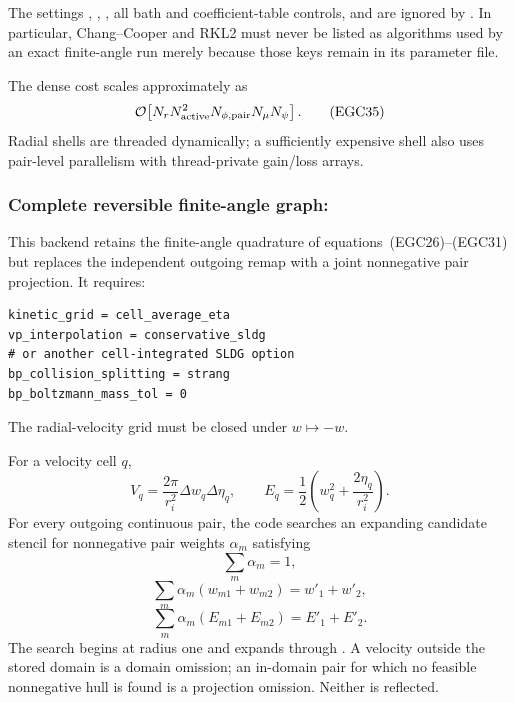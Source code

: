 The settings ,
, , all bath and
coefficient-table controls, and  are ignored by
.  In particular, Chang--Cooper and RKL2 must never be
listed as algorithms used by an exact finite-angle run merely because those
keys remain in its parameter file.

The dense cost scales approximately as
\[
 {\cal O}\!\left[
 N_rN_{\rm active}^2
 N_{\phi,\rm pair}N_\mu N_\psi
 \right].                                                \tag{EGC35}
\]
Radial shells are threaded dynamically; a sufficiently expensive shell also
uses pair-level parallelism with thread-private gain/loss arrays.

\subsubsection[Complete reversible finite-angle graph]{
Complete reversible finite-angle graph:
}

This backend retains the finite-angle quadrature of
equations~(EGC26)--(EGC31) but replaces the independent outgoing remap with a
joint nonnegative pair projection.  It requires:
\begin{lstlisting}
kinetic_grid = cell_average_eta
vp_interpolation = conservative_sldg
# or another cell-integrated SLDG option
bp_collision_splitting = strang
bp_boltzmann_mass_tol = 0
\end{lstlisting}
The radial-velocity grid must be closed under \(w\mapsto-w\).

For a velocity cell \(q\),
\[
 V_q=\frac{2\pi}{r_i^2}\Delta w_q\Delta\eta_q,\qquad
 E_q=\frac12\left(w_q^2+\frac{2\eta_q}{r_i^2}\right).     \tag{EGC36}
\]
For every outgoing continuous pair, the code searches an expanding candidate
stencil for nonnegative pair weights \(\alpha_m\) satisfying
\[
 \sum_m\alpha_m=1,                                       \tag{EGC37}
\]
\[
 \sum_m\alpha_m(w_{m1}+w_{m2})=w'_1+w'_2,                \tag{EGC38}
\]
\[
 \sum_m\alpha_m(E_{m1}+E_{m2})=E'_1+E'_2.                \tag{EGC39}
\]
The search begins at radius one and expands through
.  A velocity outside the stored domain
is a domain omission; an in-domain pair for which no feasible nonnegative
hull is found is a projection omission.  Neither is reflected.

